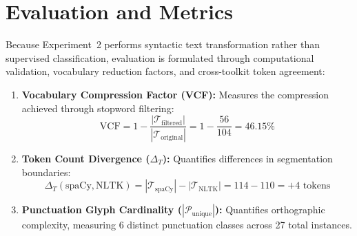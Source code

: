 \documentclass[12pt,a4paper]{report}
\begin{document}
\section{Evaluation and Metrics}
Because Experiment~2 performs syntactic text transformation rather than supervised classification, evaluation is formulated through computational validation, vocabulary reduction factors, and cross-toolkit token agreement:
\begin{enumerate}
    \item \textbf{Vocabulary Compression Factor (VCF):} Measures the compression achieved through stopword filtering:
    \begin{equation}
        \text{VCF} = 1 - \frac{|\mathcal{T}_{\text{filtered}}|}{|\mathcal{T}_{\text{original}}|} = 1 - \frac{56}{104} = 46.15\%
    \end{equation}
    \item \textbf{Token Count Divergence ($\Delta_T$):} Quantifies differences in segmentation boundaries:
    \begin{equation}
        \Delta_T(\text{spaCy}, \text{NLTK}) = |\mathcal{T}_{\text{spaCy}}| - |\mathcal{T}_{\text{NLTK}}| = 114 - 110 = +4 \text{ tokens}
    \end{equation}
    \item \textbf{Punctuation Glyph Cardinality ($|\mathcal{P}_{\text{unique}}|$):} Quantifies orthographic complexity, measuring 6 distinct punctuation classes across 27 total instances.
\end{enumerate}
\end{document}

